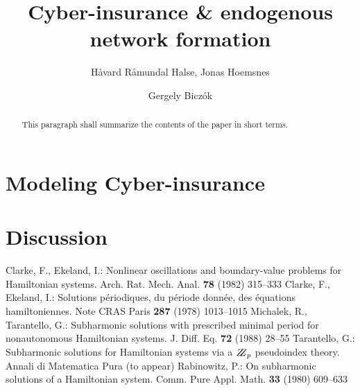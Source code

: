 \documentclass{llncs}
\begin{document}
\title{Cyber-insurance \& endogenous network formation}

\author{Håvard Råmundal Halse, Jonas Hoemsnes \and Gergely Biczók}


\maketitle
%

\begin{abstract}
This paragraph shall summarize the contents of the paper
in short terms.
\end{abstract}
%

\section{Modeling Cyber-insurance}


\section{Discussion}


%
\begin{thebibliography}{[MT1]}
%
Clarke, F., Ekeland, I.:
Nonlinear oscillations and
boundary-value problems for Hamiltonian systems.
Arch. Rat. Mech. Anal. {\bfseries 78} (1982) 315--333
%
Clarke, F., Ekeland, I.:
Solutions p\'{e}riodiques, du
p\'{e}riode donn\'{e}e, des \'{e}quations hamiltoniennes.
Note CRAS Paris {\bfseries 287} (1978) 1013--1015
%
Michalek, R., Tarantello, G.:
Subharmonic solutions with prescribed minimal
period for nonautonomous Hamiltonian systems.
J. Diff. Eq. {\bfseries 72} (1988) 28--55
%
Tarantello, G.:
Subharmonic solutions for Hamiltonian
systems via a $\bbbz_{p}$ pseudoindex theory.
Annali di Matematica Pura (to appear)
%
Rabinowitz, P.:
On subharmonic solutions of a Hamiltonian system.
Comm. Pure Appl. Math. {\bfseries 33} (1980) 609--633
\end{thebibliography}
%
\end{document}
